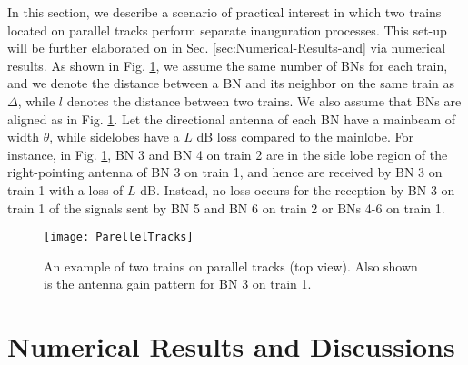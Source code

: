 \documentclass[10pt,english,two column]{IEEEtran}
\begin{document}
In this section, we describe a scenario of practical interest in which
two trains located on parallel tracks perform separate inauguration
processes. This set-up will be further elaborated on in Sec. \ref{sec:Numerical-Results-and}
via numerical results. As shown in Fig. \ref{fig:parellel tracks},
we assume the same number of BNs for each train, and we denote the
distance between a BN and its neighbor on the same train as $\Delta$,
while $l$ denotes the distance between two trains. We also assume
that BNs are aligned as in Fig. \ref{fig:parellel tracks}. Let the
directional antenna of each BN have a mainbeam of width $\theta$,
while sidelobes have a $L$ dB loss compared to the mainlobe. For
instance, in Fig. \ref{fig:parellel tracks}, BN 3 and BN 4 on train
2 are in the side lobe region of the right-pointing antenna of BN
3 on train 1, and hence are received by BN 3 on train 1 with a loss
of $L$ dB. Instead, no loss occurs for the reception by BN 3 on train
1 of the signals sent by BN 5 and BN 6 on train 2 or BNs 4-6 on train
1. 

\begin{figure}[htbp]
\begin{centering}
\textsf{\texttt{[image: ParellelTracks]}}
\par\end{centering}

\caption{\label{fig:parellel tracks} An example of two trains on parallel
tracks (top view). Also shown is the antenna gain pattern for BN 3
on train 1.}
\end{figure}



\section{Numerical Results and Discussions\label{sec:Numerical-Results-and}}
\end{document}
